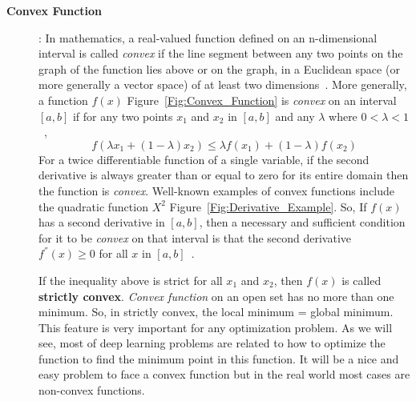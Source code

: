 \begin{description}
 \item [\textbf{Convex Function}]: In mathematics, a real-valued function defined on an n-dimensional interval is called \textit{convex} if the line segment between any two points on the graph of the function lies above or on the graph, in a Euclidean space (or more generally a vector space) of at least two dimensions~\cite{Wiki_Convex_Function}. More generally, a function $f(x)$ Figure~\ref{Fig:Convex_Function} is \textit{convex} on an interval $[a,b]$ if for any two points $x_1$ and $x_2$ in $[a,b]$ and any $\lambda$ where $0<\lambda<1$~\cite{Rudin_1976},%
%
\begin{equation}\label{eq:convex_fun}
 f(\lambda x_1 + (1-\lambda)x_2) \leq \lambda f(x_1) + (1 - \lambda) f(x_2)
\end{equation}%
%
For a twice differentiable function of a single variable, if the second derivative is always greater than or equal to zero for its entire domain then the function is \textit{convex}. Well-known examples of convex functions include the quadratic function $X^2$ Figure~\ref{Fig:Derivative_Example}. So, If $f(x)$ has a second derivative in $[a,b]$, then a necessary and sufficient condition for it to be \textit{convex} on that interval is that the second derivative $f^{''}(x) \geq 0$ for all $x$ in $[a,b]$~\cite{Wolfram_Convex}.

If the inequality above is strict for all $x_1$ and $x_2$, then $f(x)$ is called \textbf{strictly convex}. \textit{Convex function} on an open set has no more than one minimum. So, in strictly convex, the local minimum = global minimum. This feature is very important for any optimization problem. As we will see, most of deep learning problems are related to how to optimize the function to find the minimum point in this function. It will be a nice and easy problem to face a convex function but in the real world most cases are non-convex functions.


\end{description}

